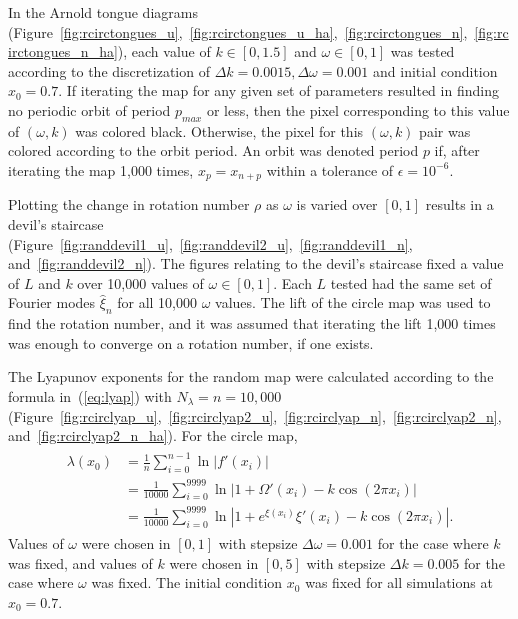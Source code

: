 In the Arnold tongue diagrams 
(Figure~\ref{fig:rcirctongues_u},~\ref{fig:rcirctongues_u_ha},~\ref{fig:rcirctongues_n},~\ref{fig:rcirctongues_n_ha}), each value of $k \in
[0,1.5]$ and $\omega \in [0,1]$ was tested according to the
discretization of $\Delta k=0.0015, \Delta \omega = 0.001$ and initial
condition $x_0=0.7$. If iterating the map for any given set of
parameters resulted in finding no periodic orbit of period $p_{max}$
or less, then the pixel corresponding to this value of $(\omega, k)$
was colored black. Otherwise, the pixel for this $(\omega, k)$ pair was colored
according to the orbit period. An orbit was
denoted period $p$ if, after iterating the map 1,000 times,
$x_p=x_{n+p}$ within a tolerance of $\epsilon = 10^{-6}$.

Plotting the change in rotation number $\rho$ as $\omega$ is varied over
$[0,1]$ results in a devil's staircase
(Figure~\ref{fig:randdevil1_u},~\ref{fig:randdevil2_u},~\ref{fig:randdevil1_n},
and~\ref{fig:randdevil2_n}). The figures relating to the
devil's staircase fixed a value of $L$ and $k$ over 10,000 values of
$\omega \in [0,1]$. Each $L$ tested had the same set of Fourier
modes $\hat{\xi}_n$ for all 10,000 $\omega$ values. The lift of the circle map was used to find the
rotation number, and it was assumed that iterating the lift 1,000
times was enough to converge on a rotation number, if one exists. 

The Lyapunov exponents for the random map were calculated according to
the formula in~(\ref{eq:lyap}) with $N_\lambda=n=10,000$
(Figure~\ref{fig:rcirclyap_u},~\ref{fig:rcirclyap2_u},~\ref{fig:rcirclyap_n},~\ref{fig:rcirclyap2_n},
and~\ref{fig:rcirclyap2_n_ha}). For the circle map, 
\begin{align}
\begin{split}
\lambda(x_0) &= \frac{1}{n} \sum_{i=0}^{n-1} \ln |f'(x_i)|\\
&= \frac{1}{10000} \sum_{i=0}^{9999} \ln |1 + \Omega'(x_i) - k\cos(2\pi x_i)|\\
&= \frac{1}{10000} \sum_{i=0}^{9999} \ln |1+e^{\xi(x_i)}\xi'(x_i)- k\cos(2\pi x_i)|.
\end{split}
\end{align}
Values of $\omega$ were chosen in $[0,1]$ with stepsize $\Delta \omega
= 0.001$ for the case where $k$ was fixed, and values of $k$ were
chosen in $[0,5]$ with stepsize $\Delta k = 0.005$ for the case where
$\omega$ was fixed. The initial condition $x_0$ was fixed for all
simulations at $x_0=0.7$.

